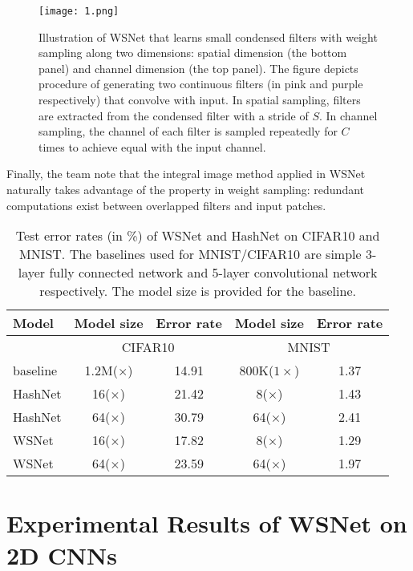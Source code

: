 \documentclass[10pt,twocolumn,letterpaper]{article}
\begin{document}
\begin{figure}[h]
	\begin{center}
		\texttt{[image: 1.png]}
	\end{center}
	\caption{Illustration of WSNet that learns small condensed filters with weight sampling along two dimensions: spatial dimension (the bottom panel) and channel dimension (the top panel). The figure depicts procedure of generating two continuous filters (in pink and purple respectively) that convolve with input. In spatial sampling, filters are extracted from the condensed filter with a stride of $S$. In channel sampling, the channel of each filter is sampled repeatedly for $C$ times to achieve equal with the input channel.}
	\label{procedure}
\end{figure}

Finally, the team note that the integral image method applied in WSNet naturally takes advantage of the property in weight sampling: redundant computations exist between overlapped filters and input patches.

\begin{table}[hpbt]
	\caption{Test error rates (in \%) of WSNet and HashNet on CIFAR10 and MNIST. The baselines used for MNIST/CIFAR10 are simple 3-layer fully connected network and 5-layer convolutional network respectively. The model size is provided for the baseline.} \label{Test}
	\begin{center}
		\begin{tabular}{|l|c c|c c|}
			\hline
			Model & Model size & Error rate& Model size & Error rate\\
			\hline\hline
			& \multicolumn{2}{|c|}{CIFAR10} & \multicolumn{2}{|c|}{MNIST} \\
			\hline
			baseline & 1.2M($\times$)& 14.91& 800K($1\times$)& 1.37 \\
			\hline
			HashNet & 16($\times$) & 21.42& 8($\times$)& 1.43\\
			HashNet & 64($\times$) & 30.79& 64($\times$)& 2.41\\
			\hline
			WSNet & 16($\times$) & 17.82& 8($\times$)& 1.29\\
			WSNet & 64($\times$) & 23.59& 64($\times$)& 1.97\\
			\hline
		\end{tabular} 
	\end{center}
\end{table}

\section{Experimental Results of WSNet on 2D CNNs}
\end{document}
